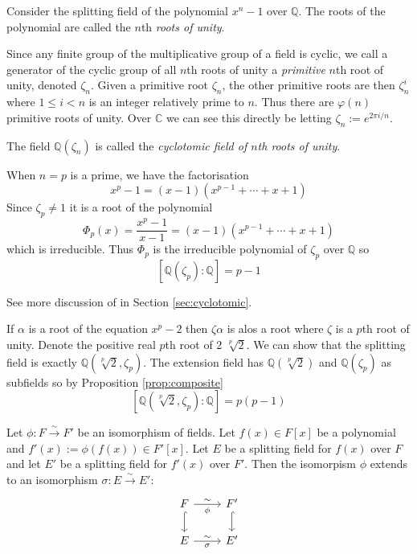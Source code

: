 \documentclass[a4paper]{article}
\begin{document}
\begin{eg}
  Consider the splitting field of the polynomial $x^n-1$ over $\mathbb{Q}$. The roots of the polynomial are called the $n$th \emph{roots of unity}.

  Since any finite group of the multiplicative group of a field is cyclic, we call a generator of the cyclic group of all $n$th roots of unity a \emph{primitive} $n$th root of unity, denoted $\zeta_n$. Given a primitive root $\zeta_n$, the other primitive roots are then $\zeta_n^i$ where $1 \leq i < n$ is an integer relatively prime to $n$. Thus there are $\varphi(n)$ primitive roots of unity. Over $\mathbb{C}$ we can see this directly be letting $\zeta_n:=e^{2\pi i/n}$.

  The field $\mathbb{Q}(\zeta_n)$ is called the \emph{cyclotomic field of $n$th roots of unity}.

  When $n=p$ is a prime, we have the factorisation
  \[
    x^p-1 = (x-1)(x^{p-1}+\cdots+x+1)
  \]
  Since $\zeta_p \neq 1$ it is a root of the polynomial
  \[
    \Phi_p(x) = \frac{x^p-1}{x-1} = (x-1)(x^{p-1}+\cdots+x+1)
  \]
  which is irreducible. Thus $\Phi_p$ is the irreducible polynomial of $\zeta_p$ over $\mathbb{Q}$ so
  \[[\mathbb{Q}(\zeta_p):\mathbb{Q}] = p-1\]

  See more discussion of in Section \ref{sec:cyclotomic}.
\end{eg}

\begin{eg}
  If $\alpha$ is a root of the equation $x^p-2$ then $\zeta\alpha$ is alos a root where $\zeta$ is a $p$th root of unity. Denote the positive real $p$th root of $2$ $\sqrt[p]2$. We can show that the splitting field is exactly $\mathbb{Q}(\sqrt[p]2, \zeta_p)$. The extension field has $\mathbb{Q}(\sqrt[p]2)$ and $\mathbb{Q}(\zeta_p)$ as subfields so by Proposition \ref{prop:composite}
  \[ [\mathbb{Q}(\sqrt[p]2,\zeta_p):\mathbb{Q}] = p(p-1) \]
\end{eg}

\begin{theorem}
  Let $\phi: F\xrightarrow{\sim} F'$ be an isomorphism of fields. Let $f(x)\in F[x]$ be a polynomial and $f'(x):=\phi(f(x))\in F'[x]$. Let $E$ be a splitting field for $f(x)$ over $F$ and let $E'$ be a splitting field for $f'(x)$ over $F'$. Then the isomorpism $\phi$ extends to an isomorphism $\sigma:E\xrightarrow{\sim} E'$:
  \[
    \begin{tikzcd}
      F \arrow{r}{\sim}[swap]{\phi} \arrow[hook]{d} & F' \arrow[hook]{d}\\
      E \arrow{r}{\sim}[swap]{\sigma} & E'
    \end{tikzcd}
  \]
\end{theorem}
\end{document}
